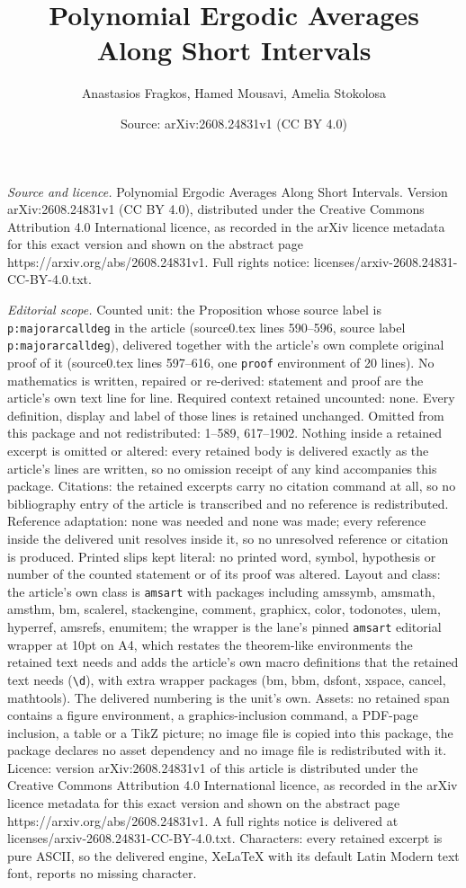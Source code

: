 \documentclass[10pt,a4paper]{amsart}
\title[Polynomial Ergodic Averages Along Short Intervals]{Polynomial Ergodic Averages Along Short Intervals}
\author{Anastasios Fragkos, Hamed Mousavi, Amelia Stokolosa}
\date{Source: arXiv:2608.24831v1 (CC BY 4.0)}
\begin{document}
\maketitle

\noindent\emph{Source and licence.} Polynomial Ergodic Averages Along Short Intervals. Version arXiv:2608.24831v1 (CC BY 4.0), distributed under the Creative Commons Attribution 4.0 International licence, as recorded in the arXiv licence metadata for this exact version and shown on the abstract page https://arxiv.org/abs/2608.24831v1. Full rights notice: licenses/arxiv-2608.24831-CC-BY-4.0.txt.\par\smallskip

\noindent\textit{Editorial scope.} Counted unit: the Proposition whose source label is \texttt{p:majorarcalldeg} in the article (source0.tex lines 590--596, source label \texttt{p:majorarcalldeg}), delivered together with the article's own complete original proof of it (source0.tex lines 597--616, one \texttt{proof} environment of 20 lines). No mathematics is written, repaired or re-derived: statement and proof are the article's own text line for line. Required context retained uncounted: none. Every definition, display and label of those lines is retained unchanged. Omitted from this package and not redistributed: 1--589, 617--1902. Nothing inside a retained excerpt is omitted or altered: every retained body is delivered exactly as the article's lines are written, so no omission receipt of any kind accompanies this package. Citations: the retained excerpts carry no citation command at all, so no bibliography entry of the article is transcribed and no reference is redistributed. Reference adaptation: none was needed and none was made; every reference inside the delivered unit resolves inside it, so no unresolved reference or citation is produced. Printed slips kept literal: no printed word, symbol, hypothesis or number of the counted statement or of its proof was altered. Layout and class: the article's own class is \texttt{amsart} with packages including amssymb, amsmath, amsthm, bm, scalerel, stackengine, comment, graphicx, color, todonotes, ulem, hyperref, amsrefs, enumitem; the wrapper is the lane's pinned \texttt{amsart} editorial wrapper at 10pt on A4, which restates the theorem-like environments the retained text needs and adds the article's own macro definitions that the retained text needs (\texttt{\textbackslash d}), with extra wrapper packages (bm, bbm, dsfont, xspace, cancel, mathtools). The delivered numbering is the unit's own. Assets: no retained span contains a figure environment, a graphics-inclusion command, a PDF-page inclusion, a table or a TikZ picture; no image file is copied into this package, the package declares no asset dependency and no image file is redistributed with it. Licence: version arXiv:2608.24831v1 of this article is distributed under the Creative Commons Attribution 4.0 International licence, as recorded in the arXiv licence metadata for this exact version and shown on the abstract page https://arxiv.org/abs/2608.24831v1. A full rights notice is delivered at licenses/arxiv-2608.24831-CC-BY-4.0.txt. Characters: every retained excerpt is pure ASCII, so the delivered engine, XeLaTeX with its default Latin Modern text font, reports no missing character.
\end{document}
